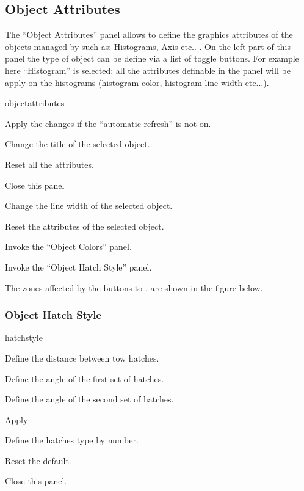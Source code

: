 \newpage

\subsection{Object Attributes}
 
The ``Object Attributes'' panel allows to define the graphics attributes
of the \HPLOT{} objects managed by \XPAW such as: Histograms, Axis etc.. .
On the left part of this panel the type of object can be define via 
a list of toggle buttons. For example here ``Histogram'' is selected: all
the attributes definable in the panel will be apply on the histograms
(histogram color, histogram line width etc...).

\begin{PAWf}[.5]{objectattributes}
\begin{EnumZB}
\item Apply the changes if the ``automatic refresh'' is not on.
\item Change the title of the selected object.
\item Reset all the attributes.
\item Close this panel
\item Change the line width of the selected object.
\item Reset the attributes of the selected object.
\item Invoke the ``Object Colors'' panel.
\item Invoke the ``Object Hatch Style'' panel.
\end{EnumZB}
The zones affected by the buttons  to , are shown in the
figure below.
\end{PAWf}


\subsubsection{Object Hatch Style}

\begin{PAWf}[.55]{hatchstyle}
\begin{EnumZW}
\item Define the distance between tow hatches.
\item Define the angle of the first set of hatches.
\item Define the angle of the second set of hatches.
\end{EnumZW}
\begin{EnumZB}
\item Apply
\item Define the hatches type by number.
\item Reset the default.
\item Close this panel.
\end{EnumZB}
\end{PAWf}

